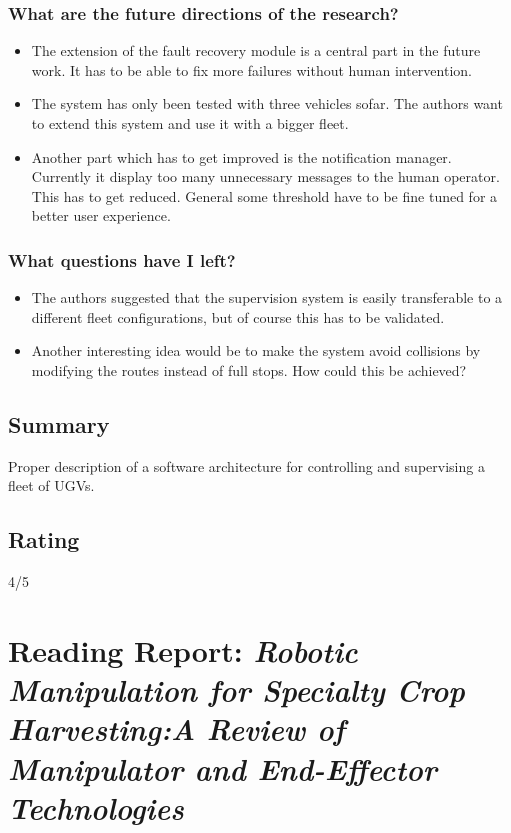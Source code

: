     \subsubsection*{What are the future directions of the research?}
    \begin{itemize}
        \item The extension of the fault recovery module is a central part in the future work. It has to be able to fix more failures without human intervention. 
        \item The system has only been tested with three vehicles sofar. The authors want to extend this system and use it with a bigger fleet.
        \item Another part which has to get improved is the notification manager. Currently it display too many unnecessary messages to the human operator. This has to get reduced. General some threshold have to be fine tuned for a better user experience.
    \end{itemize}
    \subsubsection*{What questions have I left?}
    \begin{itemize}
        \item The authors suggested that the supervision system is easily transferable to a different fleet configurations, but of course this has to be validated. 
        \item Another interesting idea would be to make the system avoid collisions by modifying the routes instead of full stops. How could this be achieved?
    \end{itemize}
    
    \subsection*{Summary}
    Proper description of a software architecture for controlling and supervising a fleet of UGVs.
    \subsection*{Rating}
    4/5
    
    
    \newpage
    \section{Reading Report: \emph{Robotic Manipulation for Specialty Crop Harvesting:A Review of Manipulator and End-Effector Technologies}}
    \cite{Davidson2020}
    
